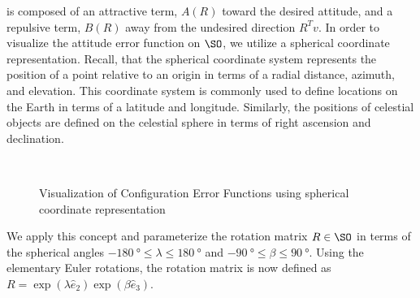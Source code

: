  is composed of an attractive term, \( A (R) \) toward the desired attitude, and a repulsive term, \( B(R) \) away from the undesired direction \( R^T v \).
In order to visualize the attitude error function on \( \SO \), we utilize a spherical coordinate representation.
Recall, that the spherical coordinate system represents the position of a point relative to an origin in terms of a radial distance, azimuth, and elevation.
This coordinate system is commonly used to define locations on the Earth in terms of a latitude and longitude.
Similarly, the positions of celestial objects are defined on the celestial sphere in terms of right ascension and declination. 
\begin{figure}[htbp]%
    \centering 
    ~
    ~
    \caption{Visualization of Configuration Error Functions using spherical coordinate representation}
    \label{fig:config_error} 
\end{figure}%
We apply this concept and parameterize the rotation matrix \( R \in \SO \) in terms of the spherical angles \( \SI{-180}{\degree} \leq \lambda \leq \SI{180}{\degree}  \) and \( \SI{-90}{\degree} \leq \beta \leq \SI{90}{\degree} \). 
Using the elementary Euler rotations, the rotation matrix is now defined as \( R = \exp( \lambda \hat{e}_2) \exp( \beta \hat{e}_3) \).
